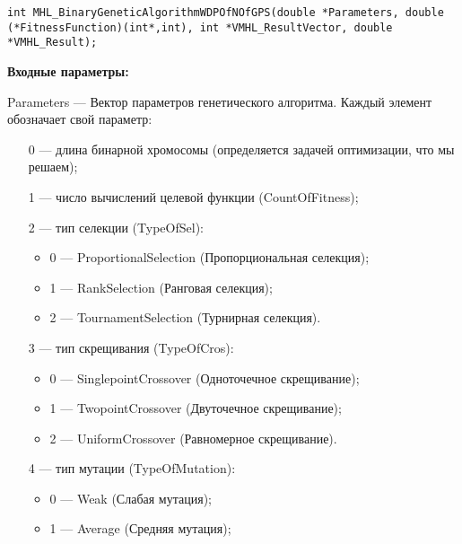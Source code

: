 \documentclass[a4paper,12pt]{article}
\begin{document}
\begin{lstlisting}[label=code_syntax_MHL_BinaryGeneticAlgorithmWDPOfNOfGPS,caption=Синтаксис]
int MHL_BinaryGeneticAlgorithmWDPOfNOfGPS(double *Parameters, double (*FitnessFunction)(int*,int), int *VMHL_ResultVector, double *VMHL_Result);
\end{lstlisting}

\textbf{Входные параметры:}
 
Parameters --- Вектор параметров генетического алгоритма. Каждый элемент обозначает свой параметр:
 
 \begin{itemize}
 \item [0] --- длина бинарной хромосомы (определяется задачей оптимизации, что мы решаем);
 
 \item [1] --- число вычислений целевой функции (CountOfFitness);
 
 \item [2] --- тип селекции (TypeOfSel):
 
 \begin{itemize}
       \item 0 --- ProportionalSelection (Пропорциональная селекция);
 
       \item 1 --- RankSelection (Ранговая селекция);
 
       \item 2 --- TournamentSelection (Турнирная селекция).
	    \end{itemize}
 
 \item [3] --- тип скрещивания (TypeOfCros):
  \begin{itemize}
       \item 0 --- SinglepointCrossover (Одноточечное скрещивание);
 
       \item 1 --- TwopointCrossover (Двуточечное скрещивание);
 
       \item 2 --- UniformCrossover (Равномерное скрещивание).
	    \end{itemize}
 
 \item [4] --- тип мутации (TypeOfMutation):
  \begin{itemize}
       \item 0 --- Weak (Слабая мутация);
 
       \item 1 --- Average (Средняя мутация);
 

\end{itemize}
\end{itemize}
\end{document}
